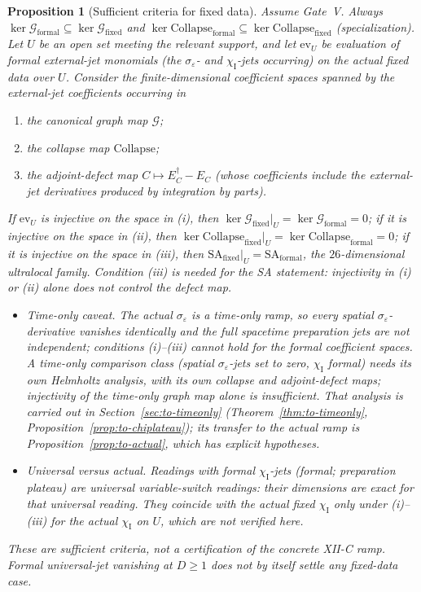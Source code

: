 \documentclass{article}
\newtheorem{proposition}{Proposition}
\theoremstyle{remark}
\newcommand{\sigeps}{\sigma_\varepsilon}
\newcommand{\chiI}{\chi_{\mathrm I}}
\newcommand{\Coll}{\mathrm{Collapse}}
\begin{document}
\begin{proposition}[Sufficient criteria for fixed data]
\label{prop:fixed-crit}
Assume Gate~V.
Always $\ker\mathcal G_{\mathrm{formal}}\subseteq\ker\mathcal G_{\mathrm{fixed}}$ and $\ker\Coll_{\mathrm{formal}}\subseteq\ker\Coll_{\mathrm{fixed}}$ (specialization).
Let $U$ be an open set meeting the relevant support, and let $\mathrm{ev}_U$ be evaluation of formal external-jet monomials (the $\sigeps$- and $\chiI$-jets occurring) on the actual fixed data over $U$.
Consider the finite-dimensional coefficient spaces spanned by the external-jet coefficients occurring in
\begin{enumerate}
\item[(i)] the canonical graph map $\mathcal G$;
\item[(ii)] the collapse map $\Coll$;
\item[(iii)] the adjoint-defect map $C\mapsto E_C^\dagger-E_C$ (whose coefficients include the external-jet derivatives produced by integration by parts).
\end{enumerate}
If $\mathrm{ev}_U$ is injective on the space in (i), then $\ker\mathcal G_{\mathrm{fixed}}|_U=\ker\mathcal G_{\mathrm{formal}}=0$; if it is injective on the space in (ii), then $\ker\Coll_{\mathrm{fixed}}|_U=\ker\Coll_{\mathrm{formal}}=0$; if it is injective on the space in (iii), then $\mathrm{SA}_{\mathrm{fixed}}|_U=\mathrm{SA}_{\mathrm{formal}}$, the $26$-dimensional ultralocal family.
Condition (iii) is needed for the SA statement: injectivity in (i) or (ii) alone does not control the defect map.
\begin{itemize}
\item \emph{Time-only caveat.} The actual $\sigeps$ is a time-only ramp, so every spatial $\sigeps$-derivative vanishes identically and the full spacetime preparation jets are not independent; conditions (i)--(iii) cannot hold for the formal coefficient spaces.
A time-only comparison class (spatial $\sigeps$-jets set to zero, $\chiI$ formal) needs its own Helmholtz analysis, with its own collapse and adjoint-defect maps; injectivity of the time-only graph map alone is insufficient.
That analysis is carried out in Section~\ref{sec:to-timeonly} (Theorem~\ref{thm:to-timeonly}, Proposition~\ref{prop:to-chiplateau}); its transfer to the actual ramp is Proposition~\ref{prop:to-actual}, which has explicit hypotheses.
\item \emph{Universal versus actual.} Readings with formal $\chiI$-jets (formal; preparation plateau) are universal variable-switch readings: their dimensions are exact for that universal reading.
They coincide with the actual fixed $\chiI$ only under (i)--(iii) for the actual $\chiI$ on $U$, which are not verified here.
\end{itemize}
These are sufficient criteria, not a certification of the concrete XII-C ramp.
Formal universal-jet vanishing at $D\ge1$ does \emph{not} by itself settle any fixed-data case.
\end{proposition}
\end{document}
